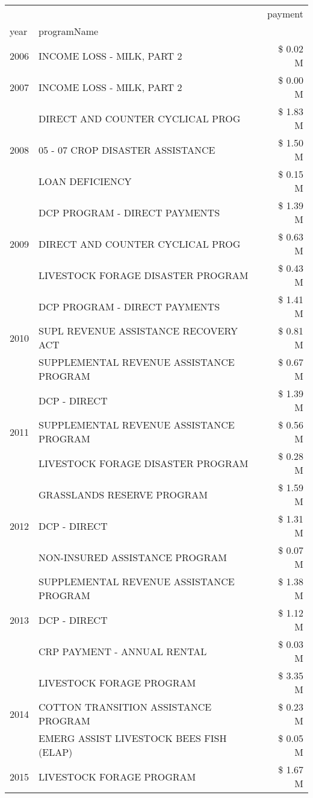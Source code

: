\begin{tabular}{llr}
\toprule
 &  & payment \\
year & programName &  \\
\midrule
2006 & INCOME LOSS - MILK, PART 2 & \$ 0.02 M \\
\cline{1-3}
2007 & INCOME LOSS - MILK, PART 2 & \$ 0.00 M \\
\cline{1-3}
\multirow[t]{3}{*}{2008} & DIRECT AND COUNTER CYCLICAL PROG & \$ 1.83 M \\
 & 05 - 07 CROP DISASTER ASSISTANCE & \$ 1.50 M \\
 & LOAN DEFICIENCY & \$ 0.15 M \\
\cline{1-3}
\multirow[t]{3}{*}{2009} & DCP PROGRAM - DIRECT PAYMENTS & \$ 1.39 M \\
 & DIRECT AND COUNTER CYCLICAL PROG & \$ 0.63 M \\
 & LIVESTOCK FORAGE DISASTER  PROGRAM & \$ 0.43 M \\
\cline{1-3}
\multirow[t]{3}{*}{2010} & DCP PROGRAM - DIRECT PAYMENTS & \$ 1.41 M \\
 & SUPL REVENUE ASSISTANCE RECOVERY ACT & \$ 0.81 M \\
 & SUPPLEMENTAL REVENUE ASSISTANCE PROGRAM & \$ 0.67 M \\
\cline{1-3}
\multirow[t]{3}{*}{2011} & DCP - DIRECT & \$ 1.39 M \\
 & SUPPLEMENTAL REVENUE ASSISTANCE PROGRAM & \$ 0.56 M \\
 & LIVESTOCK FORAGE DISASTER PROGRAM & \$ 0.28 M \\
\cline{1-3}
\multirow[t]{3}{*}{2012} & GRASSLANDS RESERVE PROGRAM & \$ 1.59 M \\
 & DCP - DIRECT & \$ 1.31 M \\
 & NON-INSURED ASSISTANCE PROGRAM & \$ 0.07 M \\
\cline{1-3}
\multirow[t]{3}{*}{2013} & SUPPLEMENTAL REVENUE ASSISTANCE PROGRAM & \$ 1.38 M \\
 & DCP - DIRECT & \$ 1.12 M \\
 & CRP PAYMENT - ANNUAL RENTAL & \$ 0.03 M \\
\cline{1-3}
\multirow[t]{3}{*}{2014} & LIVESTOCK FORAGE PROGRAM & \$ 3.35 M \\
 & COTTON TRANSITION ASSISTANCE PROGRAM & \$ 0.23 M \\
 & EMERG ASSIST LIVESTOCK BEES FISH (ELAP) & \$ 0.05 M \\
\cline{1-3}
\multirow[t]{3}{*}{2015} & LIVESTOCK FORAGE PROGRAM & \$ 1.67 M \\

\end{tabular}
